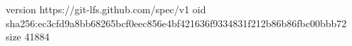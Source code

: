 version https://git-lfs.github.com/spec/v1
oid sha256:ec3cfd9a8bb68265bcf0eec856e4bf421636f9334831f212b86b86fbc00bbb72
size 41884
